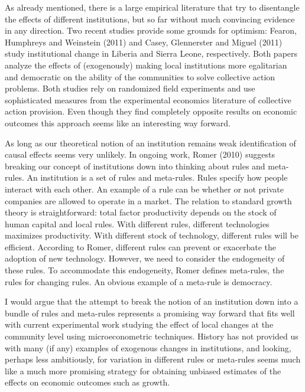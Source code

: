 \documentclass[12pt]{article}%
\begin{document}
As already mentioned, there is a large empirical literature that try to disentangle the effects of different institutions, but so far without much convincing evidence in any direction. Two recent studies provide some grounds for optimism: Fearon, Humphreys and Weinstein (2011) and Casey, Glennerster and Miguel (2011) study institutional change in Liberia and Sierra Leone, respectively. Both papers analyze the effects of (exogenously) making local institutions more egalitarian and democratic on the ability of the communities to solve collective action problems. Both studies rely on randomized field experiments and use sophisticated measures from the experimental economics literature of collective action provision. Even though they find completely opposite results on economic outcomes this approach seems like an interesting way forward. 

As long as our theoretical notion of an institution remains weak identification of causal effects seems very unlikely. In ongoing work, Romer (2010) suggests breaking our concept of institutions down into thinking about rules and meta-rules. An institution is a set of rules and meta-rules. Rules specify how people interact with each other. An example of a rule can be whether or not private companies are allowed to operate in a market. The relation to standard growth theory is straightforward: total factor productivity depends on the stock of human capital and local rules. With different rules, different technologies maximizes productivity. With different stock of technology, different rules will be efficient. According to Romer, different rules can prevent or exacerbate the adoption of new technology. However, we need to consider the endogeneity of these rules. To accommodate this endogeneity, Romer defines meta-rules, the rules for changing rules. An obvious example of a meta-rule is democracy. 

I would argue that the attempt to break the notion of an institution down into a bundle of rules and meta-rules represents a promising way forward that fits well with current experimental work studying the effect of local changes at the community level using microeconometric techniques. History has not provided us with many (if any) examples of exogenous changes in institutions, and looking, perhaps less ambitiously, for variation in different rules or meta-rules seems much like a much more promising strategy for obtaining unbiased estimates of the effects on economic outcomes such as growth. 
\end{document}
